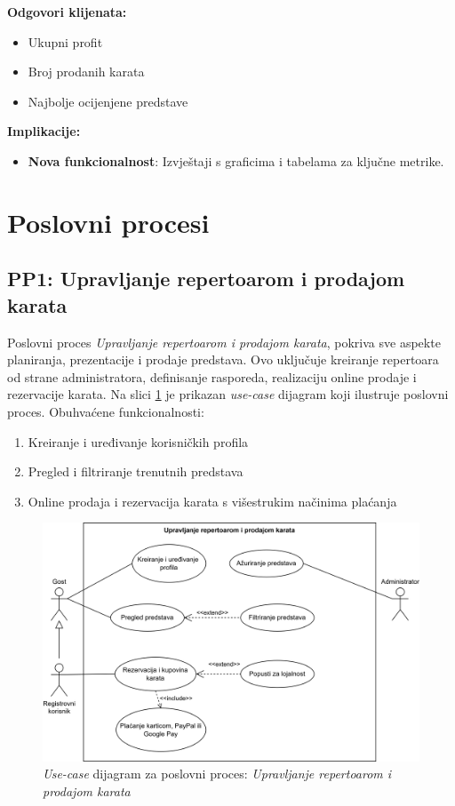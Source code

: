 \textbf{Odgovori klijenata:}  
\begin{itemize}  
    \item Ukupni profit  
    \item Broj prodanih karata  
    \item Najbolje ocijenjene predstave  
\end{itemize}  

\textbf{Implikacije:}  
\begin{itemize}  
    \item \textbf{Nova funkcionalnost}: Izvještaji s graficima i tabelama za ključne metrike.  
\end{itemize}  

\sloppy
\section{Poslovni procesi}

\sloppy
\subsection{PP1: Upravljanje repertoarom i prodajom karata}

Poslovni proces \textit{Upravljanje repertoarom i prodajom karata}, pokriva sve aspekte planiranja, prezentacije i prodaje predstava. Ovo uključuje kreiranje repertoara od strane administratora, definisanje rasporeda, realizaciju online prodaje i rezervacije karata. Na slici \ref{fig:pp1} je prikazan \textit{use-case} dijagram koji ilustruje poslovni proces. Obuhvaćene funkcionalnosti:

\begin{enumerate}
    \item Kreiranje i uređivanje korisničkih profila 
    \item Pregled i filtriranje trenutnih predstava 
    \item Online prodaja i rezervacija karata s višestrukim načinima plaćanja

\end{enumerate}

\begin{figure}[!htb]
    \centering
    \includegraphics[width=1\linewidth]{Slike/Poslovni procesi/PP1.drawio.png}
    \caption{\textit{Use-case} dijagram za poslovni proces: \textit{Upravljanje repertoarom i prodajom karata}}
    \label{fig:pp1}
\end{figure}

